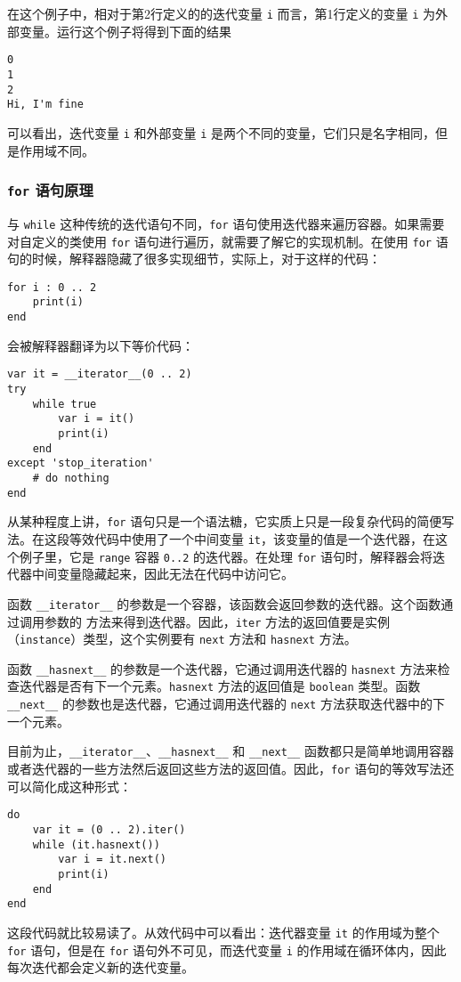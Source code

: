 在这个例子中，相对于第2行定义的的迭代变量 \texttt{i} 而言，第1行定义的变量 \texttt{i} 为外部变量。运行这个例子将得到下面的结果
\begin{lstlisting}[numbers=none]
0
1
2
Hi, I'm fine
\end{lstlisting}
可以看出，迭代变量 \texttt{i} 和外部变量 \texttt{i} 是两个不同的变量，它们只是名字相同，但是作用域不同。

\subsubsection{\texttt{for} 语句原理}

与 \texttt{while} 这种传统的迭代语句不同，\texttt{for} 语句使用迭代器来遍历容器。如果需要对自定义的类使用 \texttt{for} 语句进行遍历，就需要了解它的实现机制。在使用 \texttt{for} 语句的时候，解释器隐藏了很多实现细节，实际上，对于这样的代码：
\begin{lstlisting}[language=berry]
for i : 0 .. 2
    print(i)
end
\end{lstlisting}
会被解释器翻译为以下等价代码：
\begin{lstlisting}[language=berry]
var it = __iterator__(0 .. 2)
try
    while true
        var i = it()
        print(i)
    end
except 'stop_iteration'
    # do nothing
end
\end{lstlisting}

从某种程度上讲，\texttt{for} 语句只是一个语法糖，它实质上只是一段复杂代码的简便写法。在这段等效代码中使用了一个中间变量 \texttt{it}，该变量的值是一个迭代器，在这个例子里，它是 \texttt{range} 容器 \texttt{0..2} 的迭代器。在处理 \texttt{for} 语句时，解释器会将迭代器中间变量隐藏起来，因此无法在代码中访问它。

函数 \texttt{\_\_iterator\_\_} 的参数是一个容器，该函数会返回参数的迭代器。这个函数通过调用参数的  方法来得到迭代器。因此，\texttt{iter} 方法的返回值要是实例（\texttt{instance}）类型，这个实例要有 \texttt{next} 方法和 \texttt{hasnext} 方法。

函数 \texttt{\_\_hasnext\_\_} 的参数是一个迭代器，它通过调用迭代器的 \texttt{hasnext} 方法来检查迭代器是否有下一个元素。\texttt{hasnext} 方法的返回值是 \texttt{boolean} 类型。函数 \texttt{\_\_next\_\_} 的参数也是迭代器，它通过调用迭代器的 \texttt{next} 方法获取迭代器中的下一个元素。

目前为止，\texttt{\_\_iterator\_\_}、\texttt{\_\_hasnext\_\_} 和 \texttt{\_\_next\_\_} 函数都只是简单地调用容器或者迭代器的一些方法然后返回这些方法的返回值。因此，\texttt{for} 语句的等效写法还可以简化成这种形式：
\begin{lstlisting}[language=berry]
do
    var it = (0 .. 2).iter()
    while (it.hasnext())
        var i = it.next()
        print(i)
    end
end
\end{lstlisting}
这段代码就比较易读了。从效代码中可以看出：迭代器变量 \texttt{it} 的作用域为整个 \texttt{for} 语句，但是在 \texttt{for} 语句外不可见，而迭代变量 \texttt{i} 的作用域在循环体内，因此每次迭代都会定义新的迭代变量。

